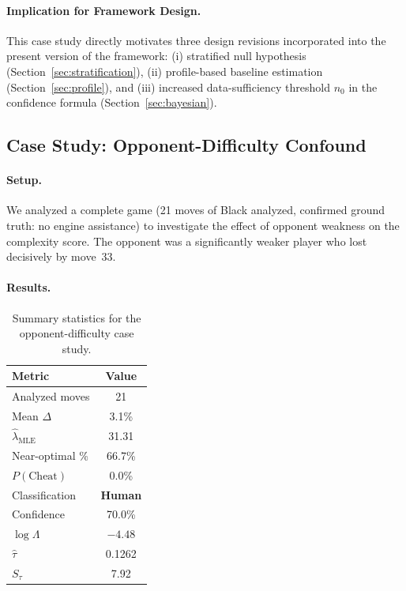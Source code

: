 \documentclass[11pt,a4paper]{article}
\begin{document}
\paragraph{Implication for Framework Design.}
This case study directly motivates three design revisions incorporated
into the present version of the framework: (i) stratified null hypothesis
(Section~\ref{sec:stratification}), (ii) profile-based baseline estimation
(Section~\ref{sec:profile}), and (iii) increased data-sufficiency threshold
$n_0$ in the confidence formula (Section~\ref{sec:bayesian}).

\subsection{Case Study: Opponent-Difficulty Confound}
\label{sec:exp_opp}

\paragraph{Setup.} We analyzed a complete game (21 moves of Black analyzed,
confirmed ground truth: no engine assistance) to investigate the effect of
opponent weakness on the complexity score. The opponent was a significantly
weaker player who lost decisively by move~33.

\paragraph{Results.}

\begin{table}[H]
\centering
\caption{Summary statistics for the opponent-difficulty case study.}
\label{tab:experiment2}
\begin{tabular}{lc}
\toprule
Metric & Value \\
\midrule
Analyzed moves              & 21      \\
Mean $\Delta$               & 3.1\%   \\
$\hat{\lambda}_\text{MLE}$  & 31.31   \\
Near-optimal \%             & 66.7\%  \\
$P(\text{Cheat})$           & 0.0\%   \\
Classification              & \textbf{Human} \\
Confidence                  & 70.0\%  \\
$\log \Lambda$              & $-4.48$ \\
$\hat{\tau}$                & 0.1262  \\
$S_\tau$                    & 7.92    \\
\bottomrule
\end{tabular}
\end{table}
\end{document}
